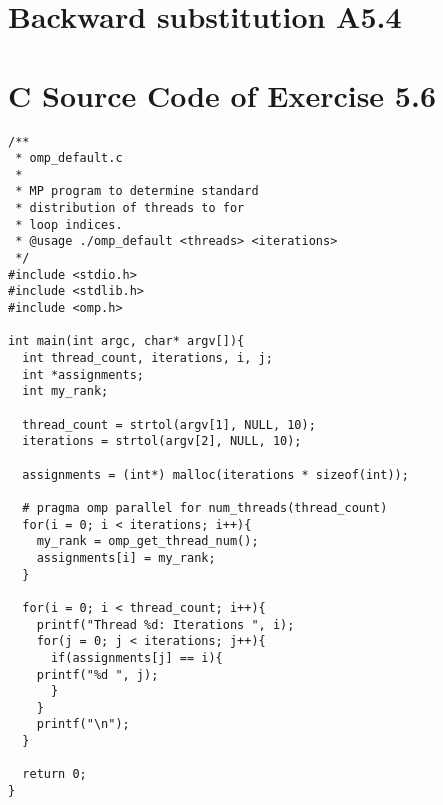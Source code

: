 \documentclass[a4paper,11pt,twoside]{article}
\begin{document}
\section{Backward substitution A5.4}

\appendix

\section{C Source Code of Exercise 5.6}{\label{app:default}}
\begin{verbatim}
/**
 * omp_default.c
 * 
 * MP program to determine standard 
 * distribution of threads to for
 * loop indices.
 * @usage ./omp_default <threads> <iterations> 
 */
#include <stdio.h>
#include <stdlib.h>
#include <omp.h>

int main(int argc, char* argv[]){
  int thread_count, iterations, i, j;
  int *assignments;
  int my_rank;

  thread_count = strtol(argv[1], NULL, 10);
  iterations = strtol(argv[2], NULL, 10);

  assignments = (int*) malloc(iterations * sizeof(int));

  # pragma omp parallel for num_threads(thread_count)
  for(i = 0; i < iterations; i++){
    my_rank = omp_get_thread_num();
    assignments[i] = my_rank;
  }

  for(i = 0; i < thread_count; i++){
    printf("Thread %d: Iterations ", i);
    for(j = 0; j < iterations; j++){
      if(assignments[j] == i){
	printf("%d ", j);
      }
    }
    printf("\n");
  }

  return 0;
}

\end{verbatim}



\end{document}

